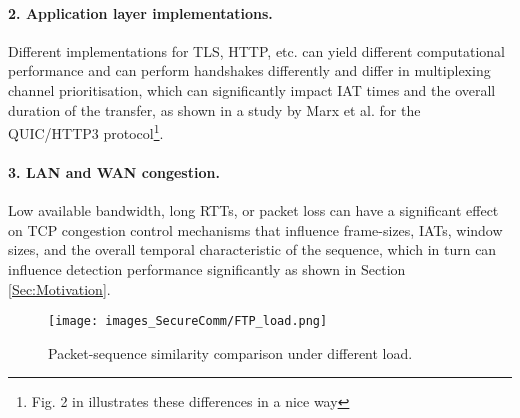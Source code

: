 

\paragraph{2. Application layer implementations.}
Different implementations for TLS, HTTP, etc. can yield different computational performance and can perform handshakes differently and differ in multiplexing channel prioritisation, which can significantly impact IAT times and the overall duration of the transfer, as shown in a study by Marx et al. \cite{marx2020same} for the QUIC/HTTP3 protocol\footnote{Fig. 2 in \cite{marx2020same} illustrates these differences in a nice way}. 


\paragraph{3. LAN and WAN congestion.}
Low available bandwidth, long RTTs, or packet loss can have a significant effect on TCP congestion control mechanisms that influence frame-sizes, IATs, window sizes, and the overall temporal characteristic of the sequence, which in turn can influence detection performance significantly as shown in Section \ref{Sec:Motivation}.


\begin{figure}
\centering
\texttt{[image: images\_SecureComm/FTP\_load.png]}
\caption{Packet-sequence similarity comparison under different load.} %
\label{Fig:FTP_load}
\end{figure}

